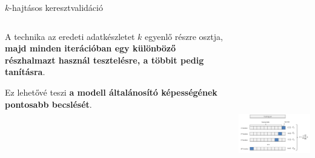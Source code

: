 \documentclass[english, aspectratio=169]{beamer}
\begin{document}
\begin{frame}{$k$-hajtásos keresztvalidáció}
\begin{columns}
\begin{column}{.4\textwidth}
A technika az eredeti adatkészletet $k$ egyenlő részre osztja, \textbf{majd minden iterációban egy különböző részhalmazt használ tesztelésre, a többit pedig tanításra}.\par\medskip
Ez lehetővé teszi \textbf{a modell általánosító képességének pontosabb becslését}.
\end{column}
\begin{column}{.6\textwidth}
\begin{center}
\includegraphics[width=9cm, height=9cm, keepaspectratio]{images/regularization_18.png}
\end{center}
\end{column}
\end{columns}
\end{frame}
\end{document}
